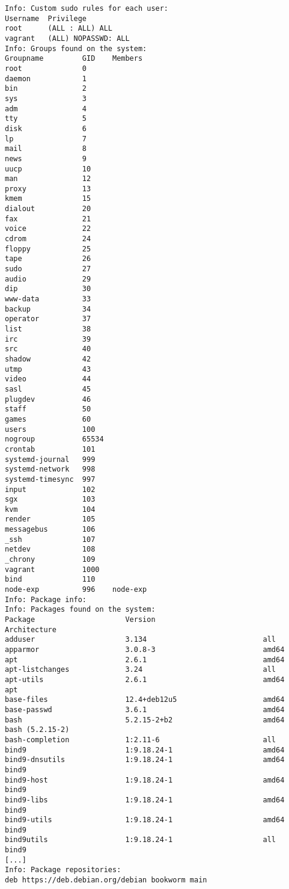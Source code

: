 \begin{longlisting}
\begin{verbatim}
Info: Custom sudo rules for each user:
Username  Privilege
root      (ALL : ALL) ALL
vagrant   (ALL) NOPASSWD: ALL
Info: Groups found on the system:
Groupname         GID    Members
root              0
daemon            1
bin               2
sys               3
adm               4
tty               5
disk              6
lp                7
mail              8
news              9
uucp              10
man               12
proxy             13
kmem              15
dialout           20
fax               21
voice             22
cdrom             24
floppy            25
tape              26
sudo              27
audio             29
dip               30
www-data          33
backup            34
operator          37
list              38
irc               39
src               40
shadow            42
utmp              43
video             44
sasl              45
plugdev           46
staff             50
games             60
users             100
nogroup           65534
crontab           101
systemd-journal   999
systemd-network   998
systemd-timesync  997
input             102
sgx               103
kvm               104
render            105
messagebus        106
_ssh              107
netdev            108
_chrony           109
vagrant           1000
bind              110
node-exp          996    node-exp
Info: Package info:
Info: Packages found on the system:
Package                     Version                         Architecture
adduser                     3.134                           all
apparmor                    3.0.8-3                         amd64
apt                         2.6.1                           amd64
apt-listchanges             3.24                            all
apt-utils                   2.6.1                           amd64         apt
base-files                  12.4+deb12u5                    amd64
base-passwd                 3.6.1                           amd64
bash                        5.2.15-2+b2                     amd64         bash (5.2.15-2)
bash-completion             1:2.11-6                        all
bind9                       1:9.18.24-1                     amd64
bind9-dnsutils              1:9.18.24-1                     amd64         bind9
bind9-host                  1:9.18.24-1                     amd64         bind9
bind9-libs                  1:9.18.24-1                     amd64         bind9
bind9-utils                 1:9.18.24-1                     amd64         bind9
bind9utils                  1:9.18.24-1                     all           bind9
[...]
Info: Package repositories:
deb https://deb.debian.org/debian bookworm main

\end{verbatim}
\end{longlisting}
